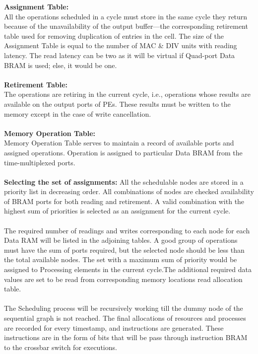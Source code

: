 \textbf{Assignment Table:}\\
All the operations scheduled in a cycle must store in the same cycle they return because of the unavailability of the output buffer—the corresponding retirement table used for removing duplication of entries in the cell. The size of the Assignment Table is equal to the number of MAC \& DIV units with reading latency. The read latency can be two as it will be virtual if Quad-port Data BRAM is used; else, it would be one.
\\
\\
\textbf{Retirement Table:}\\
The operations are retiring in the current cycle, i.e., operations whose results are available on the output ports of PEs. These results must
be written to the memory except in the case of write cancellation.
\\
\\
\textbf{Memory Operation Table:}\\
Memory Operation Table serves to maintain a record of available ports and assigned operations. Operation is assigned to particular Data BRAM from the time-multiplexed ports.
\\
\\
\textbf{Selecting the set of assignments:}
All the schedulable nodes are stored in a priority list in decreasing order. All combinations of nodes are checked availability of BRAM ports for both reading and retirement. A valid combination with the highest sum of priorities is selected as an assignment for the current cycle.
\\
\\
The required number of readings and writes corresponding to each node for each Data RAM will be listed in the adjoining tables. A good group of operations must have the sum of ports required, but the selected node should be less than the total available nodes. The set with a maximum sum of priority would be assigned to Processing elements in the current cycle.The additional required data values are set to be read from corresponding memory locations read allocation table.
\\
\\
The Scheduling process will be recursively working till the dummy node of the sequential graph is not reached. The final allocations of resources and processes are recorded for every timestamp, and instructions are generated. These instructions are in the form of bits that will be pass through instruction BRAM to the crossbar switch for executions.
